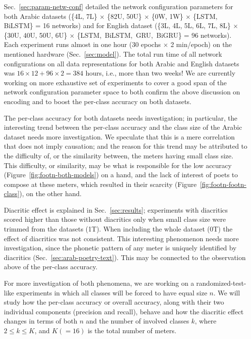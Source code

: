 Sec.~\ref{sec:param-netw-conf} detailed the network configuration parameters for both Arabic
datasets (\{4L, 7L\} $\times$ \{82U, 50U\} $\times$ \{0W, 1W\} $\times$ \{LSTM, BiLSTM\} = 16
networks) and for English dataset (\{3L, 4L, 5L, 6L, 7L, 8L\} $\times$ \{30U, 40U, 50U, 6U\}
$\times$ \{LSTM,\ BiLSTM,\ GRU,\ BiGRU\} = 96 networks). Each experiment runs almost in one hour (30
epochs $\times$ 2 min/epoch) on the mentioned hardware (Sec.~\ref{sec:model}). The total run time of
all network configurations on all data representations for both Arabic and English datasets was
$16\times 12+96\times 2 = 384$ hours, i.e., more than two weeks! We are currently working on more
exhaustive set of experiments to cover a good span of the network configuration parameter space to
both confirm the above discussion on encoding and to boost the per-class accuracy on both datasets.

\bigskip

The per-class accuracy for both datasets needs investigation; in particular, the interesting trend
between the per-class accuracy and the class size of the Arabic dataset needs more investigation. We
speculate that this is a mere correlation that does not imply causation; and the reason for this
trend may be attributed to the difficulty of, or the similarity between, the meters having small
class size. This difficulty, or similarity, may be what is responsible for the low accuracy
(Figure~\ref{fig:footn-both-models}) on a hand, and the lack of interest of poets to compose at
these meters, which resulted in their scarcity (Figure~\ref{fig:footn-footn-class}), on the other
hand.

Diacritic effect is explained in Sec.~\ref{sec:results}; experiments with diacritics scored higher
than those without diacritics only when small class size were trimmed from the datasets (1T). When
including the whole dataset (0T) the effect of diacritics was not consistent. This interesting
phenomenon needs more investigation, since the phonetic pattern of any meter is uniquely identified
by diacritics (Sec.~\ref{sec:arab-poetry-text}). This may be connected to the observation above of
the per-class accuracy.


For more investigation of both phenomena, we are working on a randomized-test-like experiments in
which all classes will be forced to have equal size $n$. We will study how the per-class accuracy or
overall accuracy, along with their two individual components (precision and recall), behave and how
the diacritic effect changes in terms of both $n$ and the number of involved classes $k$, where
$2 \leq k \leq K$, and $K(=16)$ is the total number of meters.
